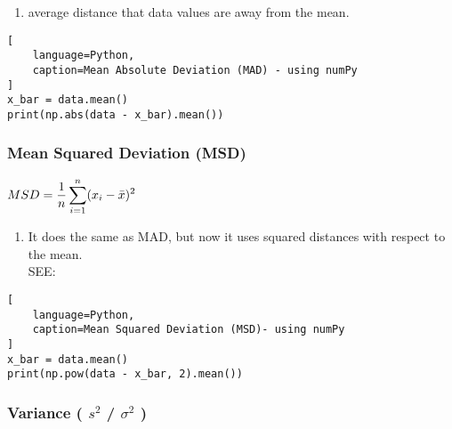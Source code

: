 \vspace{0.2cm}

\begin{enumerate}
    \item average distance that data values are away from the mean. \hfill \cite{statistics/book/Statistics-for-Data-Scientists/Maurits-Kaptein}
\end{enumerate}

\begin{lstlisting}[
    language=Python, 
    caption=Mean Absolute Deviation (MAD) - using numPy
]
x_bar = data.mean()
print(np.abs(data - x_bar).mean())
\end{lstlisting}



\subsubsection{Mean Squared Deviation (MSD) \cite{statistics/book/Statistics-for-Data-Scientists/Maurits-Kaptein}} \label{Data/Describing Data/Central Tendency/Mean Squared Deviation (MSD)}

$
    MSD
    = \dfrac{1}{n} \displaystyle\sum_{i=1}^{n} (x_i - \bar{x})^2
$ \hfill \cite{statistics/book/Statistics-for-Data-Scientists/Maurits-Kaptein}

\begin{enumerate}
    \item It does the same as MAD, but now it uses squared distances with respect to the mean.  \hfill \cite{statistics/book/Statistics-for-Data-Scientists/Maurits-Kaptein}\\
    SEE: 
    
\end{enumerate}


\begin{lstlisting}[
    language=Python, 
    caption=Mean Squared Deviation (MSD)- using numPy
]
x_bar = data.mean()
print(np.pow(data - x_bar, 2).mean())
\end{lstlisting}


\subsubsection{Variance ( $s^2$ / $\sigma^2$ ) \cite{statistics/book/Statistics-for-Data-Scientists/Maurits-Kaptein}} \label{Data/Describing Data/Central Tendency/Variance}

